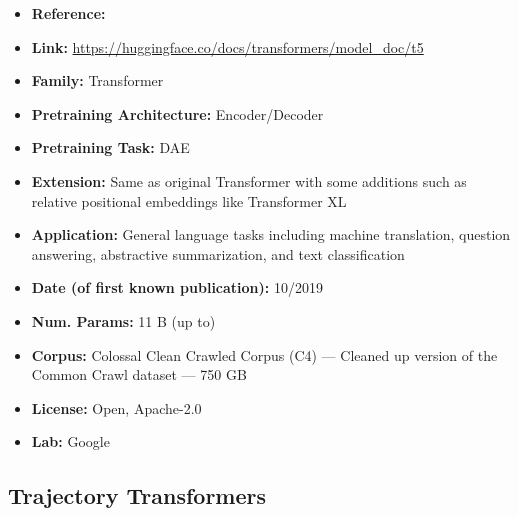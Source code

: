 \documentclass{article}
\begin{document}
            \begin{itemize}
                \item \textbf{Reference:} 
                \item \textbf{Link:} \url{https://huggingface.co/docs/transformers/model_doc/t5}
                \item \textbf{Family:} Transformer
                \item \textbf{Pretraining Architecture:} Encoder/Decoder
                \item \textbf{Pretraining Task:} DAE
                \item \textbf{Extension:} Same as original Transformer with some additions such as relative positional embeddings like Transformer XL  
                \item \textbf{Application:} General language tasks including machine translation, question answering, abstractive summarization, and text classification
                \item \textbf{Date (of first known publication):} 10/2019
                \item \textbf{Num. Params:} 11 B (up to)
                \item \textbf{Corpus:} Colossal Clean Crawled Corpus (C4) — Cleaned up version of the Common Crawl dataset — 750 GB
                \item \textbf{License:} Open, Apache-2.0
                \item \textbf{Lab:} Google
            \end{itemize}
 
\subsection{Trajectory Transformers}
\end{document}
